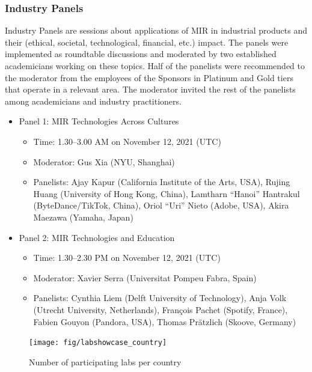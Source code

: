 \documentclass[%
10pt,								%
titlepage,						%
]
{scrartcl}
\begin{document}
        \subsubsection{Industry Panels}
            Industry Panels are sessions about applications of MIR in industrial products and their (ethical, societal, technological, financial, etc.) impact. The panels were implemented as roundtable discussions and moderated by two established academicians working on these topics. Half of the panelists were recommended to the moderator from the employees of the Sponsors in Platinum and Gold tiers that operate in a relevant area. The moderator invited the rest of the panelists among academicians and industry practitioners.
            \begin{itemize}
                \item Panel 1: MIR Technologies Across Cultures
                    \begin{itemize}
                        \item Time: 1.30--3.00 AM on November 12, 2021 (UTC)
                        \item   Moderator: Gus Xia (NYU, Shanghai)
                        \item   Panelists: Ajay Kapur (California Institute of the Arts, USA), Rujing Huang (University of Hong Kong, China), Lamtharn ``Hanoi'' Hantrakul (ByteDance/TikTok, China), Oriol ``Uri'' Nieto (Adobe, USA), Akira Maezawa (Yamaha, Japan)
                    \end{itemize}
                \item Panel 2: MIR Technologies and Education
                    \begin{itemize}
                        \item Time: 1.30--2.30 PM on November 12, 2021 (UTC)
                        \item  Moderator: Xavier Serra (Universitat Pompeu Fabra, Spain)
                        \item  Panelists: Cynthia Liem (Delft University of Technology), Anja Volk (Utrecht University, Netherlands), Fran\c{c}ois Pachet (Spotify, France), Fabien Gouyon (Pandora, USA), Thomas Pr\"atzlich (Skoove, Germany) 
                    \end{itemize}
            \end{itemize}
    
        \begin{figure}%
            \centering
            \texttt{[image: fig/labshowcase\_country]}%
            \caption{Number of participating labs per country}%
            \label{fig:labshowcase_country}%
        \end{figure}
\end{document}
